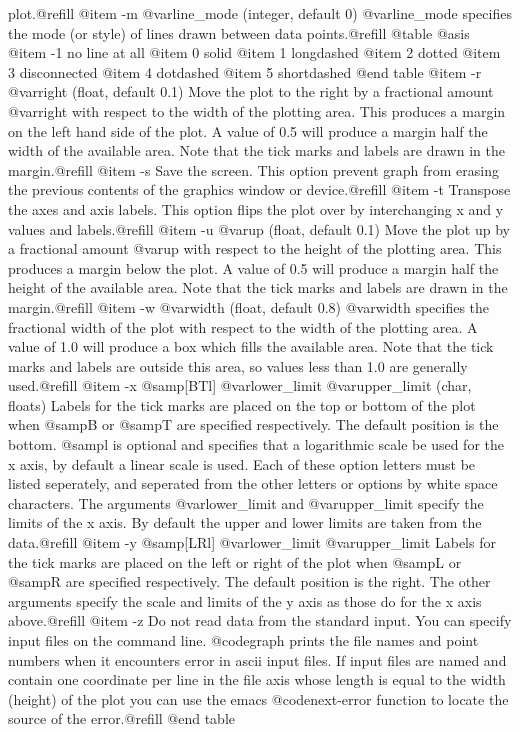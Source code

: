 plot.@refill
@item -m @var{line_mode}
(integer, default 0) @var{line_mode} specifies the mode (or style) of
lines drawn between data points.@refill
@table @asis
@item -1 no line at all
@item 0 solid
@item 1 longdashed
@item 2 dotted
@item 3 disconnected
@item 4 dotdashed
@item 5 shortdashed
@end table
@item -r @var{right}
(float, default 0.1) Move the plot to the right by a fractional amount
@var{right} with respect to the width of the plotting area.  This
produces a margin on the left hand side of the plot.  A value of 0.5
will produce a margin half the width of the available area.  Note that
the tick marks and labels are drawn in the margin.@refill
@item -s
Save the screen. This option prevent graph from erasing the previous
contents of the graphics window or device.@refill
@item -t
Transpose the axes and axis labels. This option flips the plot over by
interchanging x and y values and labels.@refill
@item -u @var{up}
(float, default 0.1) Move the plot up by a fractional amount @var{up}
with respect to the height of the plotting area.  This produces a margin
below the plot.  A value of 0.5 will produce a margin half the height of
the available area.  Note that the tick marks and labels are drawn in
the margin.@refill
@item -w @var{width}
(float, default 0.8) @var{width} specifies the fractional width of the
plot with respect to the width of the plotting area.  A value of 1.0
will produce a box which fills the available area.  Note that the tick
marks and labels are outside this area, so values less than 1.0 are
generally used.@refill
@item -x @samp{[BTl]} @var{lower_limit} @var{upper_limit}
(char, floats) Labels for the tick marks are placed on the top or bottom
of the plot when @samp{B} or @samp{T} are specified respectively.  The
default position is the bottom.  @samp{l} is optional and specifies that
a logarithmic scale be used for the x axis, by default a linear scale is
used. Each of these option letters must be listed seperately, and
seperated from the other letters or options by white space characters.
The arguments @var{lower_limit} and @var{upper_limit} specify the limits
of the x axis. By default the upper and lower limits are taken from the
data.@refill
@item -y @samp{[LRl]} @var{lower_limit} @var{upper_limit}
Labels for the tick marks are placed on the left or right of the plot
when @samp{L} or @samp{R} are specified respectively.  The default
position is the right.  The other arguments specify the scale and limits
of the y axis as those do for the x axis above.@refill
@item -z
Do not read data from the standard input.  You can specify input files
on the command line.  @code{graph} prints the file names and point
numbers when it encounters error in ascii input files. If input files are
named and contain one coordinate per line in the file axis whose length
is equal to the width (height) of the plot you can use the emacs
@code{next-error} function to locate the source of the error.@refill
@end table

